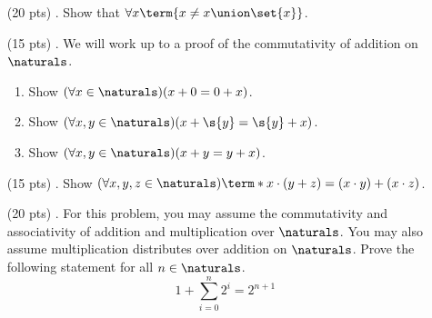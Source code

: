 \begin{enumerate}
\begin{mdframed}
\begin{proof}
        Therefore, everyone on Earth has the same age.
      \end{proof}
    \end{mdframed}

  \item[(20 pts) \quad 2.]
    Show that $\forall x \term{x \neq x \union \set{x}}$.

  \item[(15 pts) \quad 3.]
    We will work up to a proof of the commutativity of addition on $\naturals$.
    \begin{enumerate}
      \item
        Show $(\forall x \in \naturals)(x + 0 = 0 + x)$.
      \item
        Show $(\forall x, y \in \naturals)(x + \s{y} = \s{y} + x)$.
      \item
        Show $(\forall x, y \in \naturals)(x + y = y + x)$.
    \end{enumerate}

  \item[(15 pts) \quad 4.]
    Show $(\forall x, y, z \in \naturals)\term*{x \cdot (y + z) = (x \cdot y) + (x \cdot z)}$.



  \item[(20 pts) \quad 5.]
    For this problem, you may assume the commutativity and associativity of addition and multiplication over $\naturals$.
    You may also assume multiplication distributes over addition on $\naturals$.
    Prove the following statement for all $n \in \naturals$.
    \begin{equation*}
      1 + \sum_{i = 0}^{n} 2^i = 2^{n + 1}
    \end{equation*}


\end{enumerate}
